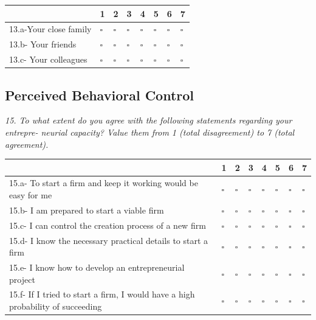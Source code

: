 \begin{table}[H]
\scriptsize	
\centering

\begin{tabular}{p{10cm}lllllll}
\toprule
                                                                             & 1         & 2         & 3         & 4         & 5         & 6         & 7         \\ \midrule
13.a-Your close family & $\square$ & $\square$ & $\square$ & $\square$ & $\square$ & $\square$ & $\square$ \\
13.b- Your friends                          & $\square$ & $\square$ & $\square$ & $\square$ & $\square$ & $\square$ & $\square$ \\
13.c- Your colleagues      & $\square$ & $\square$ & $\square$ & $\square$ & $\square$ & $\square$ & $\square$ \\ \bottomrule
\end{tabular}
\end{table}


\subsection{Perceived Behavioral Control}
\emph{15. To what extent do you agree with the following statements regarding your entrepre- neurial capacity? Value them from 1 (total disagreement) to 7 (total agreement).}

\begin{table}[H]
\scriptsize	
\centering

\begin{tabular}{p{10cm}lllllll}
\toprule
                                                                               & 1         & 2         & 3         & 4         & 5         & 6         & 7         \\ \midrule
15.a- To start a firm and keep it working would be easy for me                  & $\square$ & $\square$ & $\square$ & $\square$ & $\square$ & $\square$ & $\square$ \\
15.b- I am prepared to start a viable firm                                      & $\square$ & $\square$ & $\square$ & $\square$ & $\square$ & $\square$ & $\square$ \\
15.c- I can control the creation process of a new firm                          & $\square$ & $\square$ & $\square$ & $\square$ & $\square$ & $\square$ & $\square$ \\
15.d- I know the necessary practical details to start a firm                    & $\square$ & $\square$ & $\square$ & $\square$ & $\square$ & $\square$ & $\square$ \\
15.e- I know how to develop an entrepreneurial project                          & $\square$ & $\square$ & $\square$ & $\square$ & $\square$ & $\square$ & $\square$ \\
15.f- If I tried to start a firm, I would have a high probability of succeeding & $\square$ & $\square$ & $\square$ & $\square$ & $\square$ & $\square$ & $\square$ \\ \bottomrule
\end{tabular}
\end{table}


